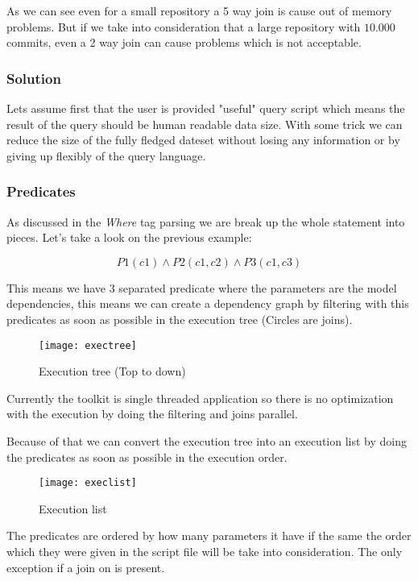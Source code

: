 As we can see even for a small repository a 5 way join is cause out of memory problems. But if we take into consideration that a large repository with $10.000$ commits, even a 2 way join can cause problems which is not acceptable. 
\newpage

\subsubsection{Solution}

Lets assume first that the user is provided "useful" query script which means the result of the query should be human readable data size. With some trick we can reduce the size of the fully fledged dateset without losing any information or by giving up flexibly of the query language. 

\subsubsection{Predicates}

As discussed in the \textit{Where} tag parsing we are break up the whole statement into pieces. Let's take a look on the previous example:

\[ P1(c1) \wedge P2(c1,c2) \wedge P3(c1,c3)\]

This means we have 3 separated predicate where the parameters are the model dependencies, this means we can create a dependency graph by filtering with this predicates as soon as possible  in the execution tree (Circles are joins).

 \begin{figure}[H]
	\centering
	\texttt{[image: exectree]}
	\caption{Execution tree (Top to down)}
	\label{fig:fig-help}
\end{figure}

\newpage

Currently the toolkit is single threaded application so there is no optimization with the execution by doing the filtering and joins parallel.

Because of that we can convert the execution tree into an execution list by doing the predicates as soon as possible in the execution order.

 \begin{figure}[H]
	\centering
	\texttt{[image: execlist]}
	\caption{Execution list}
	\label{fig:fig-help}
\end{figure}

The predicates are ordered by how many parameters it have if the same the order which they were given in the script file will be take into consideration. The only exception if a join on is present.

